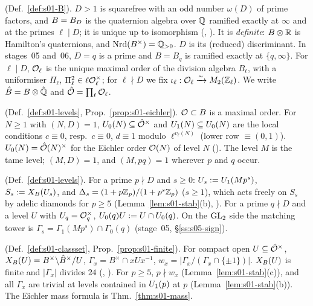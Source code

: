 \begin{description}[leftmargin=0pt,itemsep=3pt]
\item[The algebra] (Def.~\ref{def:s01-B}). $D>1$ is squarefree with an odd number $\omega(D)$ of prime factors, and $B=B_D$ is the
  quaternion algebra over $\mathbb{Q}$ ramified exactly at $\infty$ and at the primes $\ell\mid D$; it is unique up to isomorphism
  (\stknown, \cite{Vo}). It is \emph{definite}: $B\otimes\mathbb{R}$ is Hamilton's quaternions, and $\mathrm{Nrd}(B^\times)=\mathbb{Q}_{>0}$. $D$ is its
  (reduced) discriminant. In stages~05 and~06, $D=q$ is a prime and $B=B_q$ is ramified exactly at $\{q,\infty\}$. For $\ell\mid D$,
  $\mathcal{O}_\ell$ is the unique maximal order of the division algebra $B_\ell$, with a uniformiser $\Pi_\ell$, $\Pi_\ell^2\in\ell\mathcal{O}_\ell^\times$;
  for $\ell\nmid D$ we fix $\iota_\ell:\mathcal{O}_\ell\xrightarrow\sim M_2(\mathbb{Z}_\ell)$. We write $\hat B=B\otimes\hat{\mathbb{Q}}$ and $\hat{\mathcal{O}}=\prod_\ell\mathcal{O}_\ell$.
\item[Orders and levels] (Def.~\ref{def:s01-levels}, Prop.~\ref{prop:s01-eichler}). $\mathcal{O}\subset B$ is a maximal order. For $N\ge1$
  with $(N,D)=1$, $U_0(N)\subseteq\hat{\mathcal{O}}^\times$ and $U_1(N)\subseteq U_0(N)$ are the local conditions $c\equiv0$, resp.\ $c\equiv0$, $d\equiv1$
  modulo $\ell^{v_\ell(N)}$ (lower row $\equiv(0,1)$). $U_0(N)=\hat{\mathcal{O}}(N)^\times$ for the Eichler order $\mathcal{O}(N)$ of level $N$
  (\stknown). The level $M$ is the tame level; $(M,D)=1$, and $(M,pq)=1$ wherever $p$ and $q$ occur.
\item[The tower] (Def.~\ref{def:s01-levels}). For a prime $p\nmid D$ and $s\ge0$: $U_s:=U_1(Mp^s)$, $S_s:=X_B(U_s)$, and
  $\Delta_s=(1+p\mathbb{Z}_p)/(1+p^s\mathbb{Z}_p)$ ($s\ge1$), which acts freely on $S_s$ by adelic diamonds for $p\ge5$ (Lemma~\ref{lem:s01-stab}(b), \stproved).
  For a prime $q\nmid D$ and a level $U$ with $U_q=\mathcal{O}_q^\times$, $U_0(q)U:=U\cap U_0(q)$. On the $\mathrm{GL}_2$ side the matching tower
  is $\Gamma_s=\Gamma_1(Mp^s)\cap\Gamma_0(q)$ (stage~05, \S\ref{ss:s05-sign}).
\item[Class sets] (Def.~\ref{def:s01-classset}, Prop.~\ref{prop:s01-finite}). For compact open $U\subseteq\hat{\mathcal{O}}^\times$,
  $X_B(U)=B^\times\backslash\hat B^\times/U$, $\Gamma_x=B^\times\cap xUx^{-1}$, $w_x=|\Gamma_x/(\Gamma_x\cap\{\pm1\})|$. $X_B(U)$ is finite and
  $|\Gamma_x|$ divides $24$ (\stknown, \stformal). For $p\ge5$, $p\nmid w_x$ (Lemma~\ref{lem:s01-stab}(c)), and all $\Gamma_x$ are trivial
  at levels contained in $U_1(p)$ at $p$ (Lemma~\ref{lem:s01-stab}(b)). The Eichler mass formula is Thm.~\ref{thm:s01-mass}.
\end{description}

